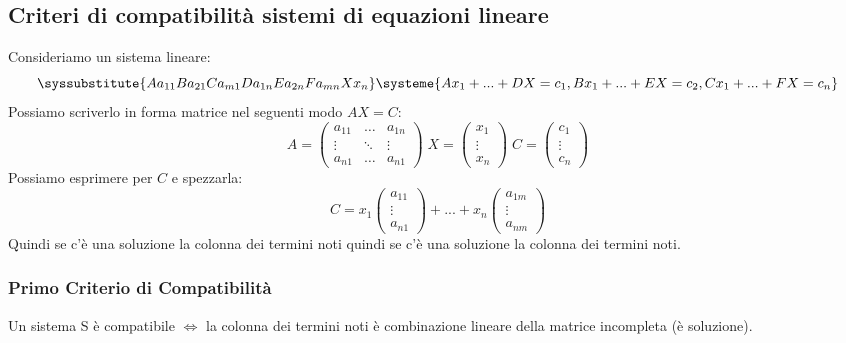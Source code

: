 \subsection{Criteri di compatibilità sistemi di equazioni lineare}
Consideriamo un sistema lineare:
$$
\syssubstitute{A{a_{11}}B{a_{21}}C{a_{m1}}D{a_{1n}}E{a_{2n}}F{a_{mn}}X{x_{n}}}
\systeme{
  A x_1 +...+ D X  = c_1,
  B x_1 +...+ E X = c_2,
  C x_1 +...+ F X = c_n
}
$$
Possiamo scriverlo in forma matrice nel seguenti modo $AX=C$:
$$ A = \begin{pmatrix} a_{11} & \dots & a_{1n} \\ \vdots & \ddots & \vdots \\ a_{n1} & \dots & a_{n1} \end{pmatrix} \; X = \begin{pmatrix} x_1 \\ \vdots \\ x_n \end{pmatrix} \; C =  \begin{pmatrix} c_1 \\ \vdots \\ c_n \end{pmatrix} $$
Possiamo esprimere per $C$ e spezzarla:
$$ 
C = x_1 \begin{pmatrix} a_{11} \\ \vdots \\ a_{n1} \end{pmatrix} +...+ x_n \begin{pmatrix} a_{1m} \\ \vdots \\ a_{nm} \end{pmatrix}
$$
Quindi se c’è una soluzione la colonna dei termini noti quindi se c’è una soluzione la colonna dei termini noti.\\
\subsubsection{Primo Criterio di Compatibilità}
Un sistema S  è compatibile $\Leftrightarrow$ la colonna dei termini noti è combinazione lineare della matrice incompleta (è soluzione).






